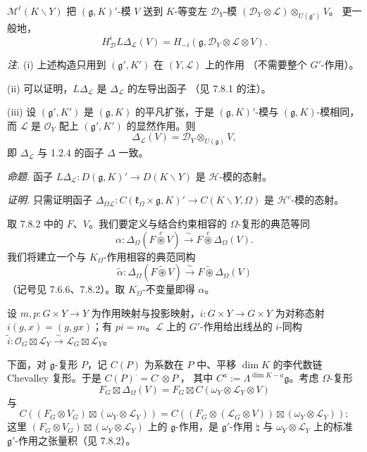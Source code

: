 
$\mathcal{M}^{\ell}(K\backslash Y)$ 把 $(\mathfrak{g},K)'$-模 $V$ 送到 $K$-等变左
$\mathcal{D}_{Y}$-模 $(\mathcal{D}_{Y}\otimes\mathcal{L})\otimes_{U(\mathfrak{g}')}V$。
更一般地，
\[
H^{i}_{\mathcal{D}}L\Delta_{\mathcal{L}}(V)=H_{-i}(\mathfrak{g},\mathcal{D}_{Y}\otimes\mathcal{L}\otimes V).
\]

 \emph{注.} (i) 上述构造只用到 $(\mathfrak{g}',K')$ 在 $(Y,\mathcal{L})$ 上的作用
（不需要整个 $G'$-作用）。

(ii) 可以证明，$L\Delta_{\mathcal{L}}$ 是 $\Delta_{\mathcal{L}}$ 的左导出函子
（见 7.8.1 的注）。

(iii) 设 $(\mathfrak{g}',K')$ 是 $(\mathfrak{g},K)$ 的平凡扩张，于是
$(\mathfrak{g},K)'$-模与 $(\mathfrak{g},K)$-模相同，而 $\mathcal{L}$ 是
$\mathcal{O}_{Y}$ 配上 $(\mathfrak{g}',K')$ 的显然作用。则
\[
\Delta_{\mathcal{L}}(V)=\mathcal{D}_{Y}\otimes_{U(\mathfrak{g})}V,
\]
即 $\Delta_{\mathcal{L}}$ 与 1.2.4 的函子 $\Delta$ 一致。

 \emph{命题.} 函子 $L\Delta_{\mathcal{L}}:D(\mathfrak{g},K)'\to D(K\backslash Y)$
是 $\mathcal{H}$-模的态射。

\emph{证明.} 只需证明函子
$\Delta_{\Omega\mathcal{L}}:C(\mathfrak{k}_{\Omega}\times\mathfrak{g},K)'\to C(K\backslash Y,\Omega)$
是 $\mathcal{H}^{c}$-模的态射。

取 7.8.2 中的 $F$、$V$。我们要定义与结合约束相容的 $\Omega$-复形的典范等同
\[
\alpha:\Delta_{\Omega}(F\overset{c}{\circledast}V)\xrightarrow{\ \sim\ }F\overset{c}{\circledast}\Delta_{\Omega}(V).
\]
我们将建立一个与 $K_{\Omega}$-作用相容的典范同构
\[
\tilde{\alpha}:\Delta_{\Omega}(F\widetilde{\circledast}V)\xrightarrow{\ \sim\ }F\widetilde{\circledast}\Delta_{\Omega}(V)
\]
（记号见 7.6.6、7.8.2）。取 $K_{\Omega}$-不变量即得 $\alpha$。

设 $m,p:G\times Y\to Y$ 为作用映射与投影映射，$i:G\times Y\to G\times Y$
为对称态射 $i(g,x)=(g,gx)$；有 $pi=m$。$\mathcal{L}$ 上的 $G'$-作用给出线丛的
$i$-同构 $\tilde{i}:\mathcal{O}_{G}\boxtimes\mathcal{L}_{Y}\xrightarrow{\sim}\mathcal{L}_{G}\boxtimes\mathcal{L}_{Y}$。

下面，对 $\mathfrak{g}$-复形 $P$，记 $C(P)$ 为系数在 $P$ 中、平移 $\dim K$
的李代数链 Chevalley 复形。于是 $C(P)^{\cdot}=C^{\cdot}\otimes P^{\cdot}$，
其中 $C^{a}:=\Lambda^{\dim K-a}\mathfrak{g}$。考虑 $\Omega$-复形
\[
F_{G}\boxtimes\Delta_{\Omega}(V)=F_{G}\boxtimes C(\omega_{Y}\otimes\mathcal{L}_{Y}\otimes V)
\]
与
\[
C((F_{G}\otimes V_{G})\boxtimes(\omega_{Y}\otimes\mathcal{L}_{Y}))
=C((F_{G}\otimes(\mathcal{L}_{G}\otimes V))\boxtimes(\omega_{Y}\otimes\mathcal{L}_{Y}));
\]
这里 $(F_{G}\otimes V_{G})\boxtimes(\omega_{Y}\otimes\mathcal{L}_{Y})$ 上的
$\mathfrak{g}$-作用，是 $\mathfrak{g}'$-作用 $\natural$ 与
$\omega_{Y}\otimes\mathcal{L}_{Y}$ 上的标准 $\mathfrak{g}'$-作用之张量积（见 7.8.2）。

